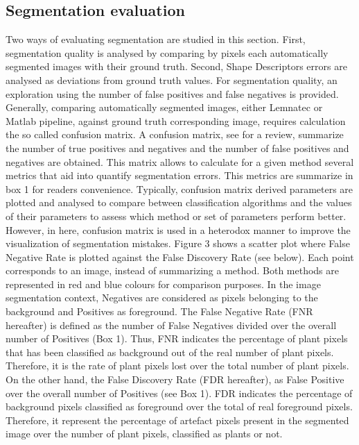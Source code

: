 \documentclass{frontiersSCNS} %
\begin{document}
\subsection{Segmentation evaluation}
Two ways of evaluating segmentation are studied in this section. First, segmentation quality is analysed by comparing by pixels each automatically segmented images with their ground truth. Second, Shape Descriptors errors are analysed as deviations from ground truth values.
For segmentation quality, an exploration using the number of false positives and false negatives is provided. Generally, comparing automatically segmented images, either Lemnatec or Matlab pipeline, against ground truth corresponding image, requires calculation the so called confusion matrix. A confusion matrix, see \cite{Fawcett:2006:IRA:1159473.1159475} for a review, summarize the number of true positives and negatives and the number of false positives and negatives are obtained. This matrix allows to calculate for a given method several metrics that aid into quantify segmentation errors. This metrics are summarize in box 1 for readers convenience. 
Typically, confusion matrix derived parameters are plotted and analysed to compare between classification algorithms and the values of their parameters to assess which method or set of parameters perform better. However, in here, confusion matrix is used in a heterodox manner to improve the visualization of segmentation mistakes. Figure 3 shows a scatter plot where False Negative Rate is plotted against the False Discovery Rate (see below). Each point corresponds to an image, instead of summarizing a method. Both methods are represented in red and blue colours for comparison purposes.
In the image segmentation context, Negatives are considered as pixels belonging to the background and Positives as foreground. The False Negative Rate (FNR hereafter) is defined as the number of False Negatives divided over the overall number of Positives (Box 1). Thus, FNR indicates the percentage of plant pixels that has been classified as background out of the real number of plant pixels. Therefore, it is the rate of plant pixels lost over the total number of plant pixels. On the other hand, the False Discovery Rate (FDR hereafter), as False Positive over the overall number of Positives (see Box 1). FDR indicates the percentage of background pixels classified as foreground over the total of real foreground pixels. Therefore, it represent the percentage of artefact pixels present in the segmented image over the number of plant pixels, classified as plants or not.
\end{document}
